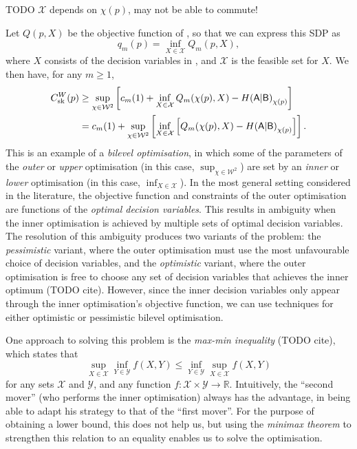 \documentclass[10pt, a4paper]{article}
\numberwithin{equation}{section} %
\theoremstyle{definition}
\theoremstyle{plain}
\newcommand{\?}{\mathrel{?}} %
\newcommand{\R}{\mathbb{R}} %
\newcommand{\sW}{\mathcal{W}}
\newcommand{\sX}{\mathcal{X}}
\newcommand{\sY}{\mathcal{Y}}
\newcommand{\crv}[1]{\mathsf{#1}}
\newcommand{\sk}{\rm sk}
\begin{document}
      TODO \(\sX\) depends on \(\chi(p)\), may not be able to commute!

      Let \(Q(p, X)\) be the objective function of , so that we can express this SDP as
      \begin{equation}
        q_m(p) = \inf_{X\in\sX} Q_m(p, X),
      \end{equation}
      where \(X\) consists of the decision variables in , and \(\sX\) is the feasible set for \(X\). We then have, for any \(m\geq 1\),
      \begin{align}
        C^W_{\sk}(p) &\geq \sup_{\chi\in\sW^2} \left[ c_m(1) + \inf_{X\in\sX} Q_m(\chi(p), X) - H{(\crv{A}|\crv{B})}_{\chi(p)} \right] \\
        &= c_m(1) + \sup_{\chi\in\sW^2} \left[ \inf_{X\in\sX} \left[ Q_m(\chi(p), X) - H{(\crv{A}|\crv{B})}_{\chi(p)} \right] \right].
      \end{align}
      This is an example of a \emph{bilevel optimisation}, in which some of the parameters of the \emph{outer} or \emph{upper} optimisation (in this case, \(\sup_{\chi\in\sW^2}\)) are set by an \emph{inner} or \emph{lower} optimisation (in this case, \(\inf_{X\in\sX}\)). In the most general setting considered in the literature, the objective function and constraints of the outer optimisation are functions of the \emph{optimal decision variables}. This results in ambiguity when the inner optimisation is achieved by multiple sets of optimal decision variables. The resolution of this ambiguity produces two variants of the problem: the \emph{pessimistic} variant, where the outer optimisation must use the most unfavourable choice of decision variables, and the \emph{optimistic} variant, where the outer optimisation is free to choose any set of decision variables that achieves the inner optimum (TODO cite). However, since the inner decision variables only appear through the inner optimisation's objective function, we can use techniques for either optimistic or pessimistic bilevel optimisation.

      One approach to solving this problem is the \emph{max-min inequality} (TODO cite), which states that 
      \begin{equation}
        \sup_{X\in\sX} \inf_{Y\in\sY} f(X,Y) \leq \inf_{Y\in\sY} \sup_{X\in\sX} f(X,Y)
      \end{equation}
      for any sets \(\sX\) and \(\sY\), and any function \(f : \sX\times\sY \to \R\). Intuitively, the ``second mover'' (who performs the inner optimisation) always has the advantage, in being able to adapt his strategy to that of the ``first mover''. For the purpose of obtaining a lower bound, this does not help us, but using the \emph{minimax theorem} to strengthen this relation to an equality enables us to solve the optimisation.
\end{document}
